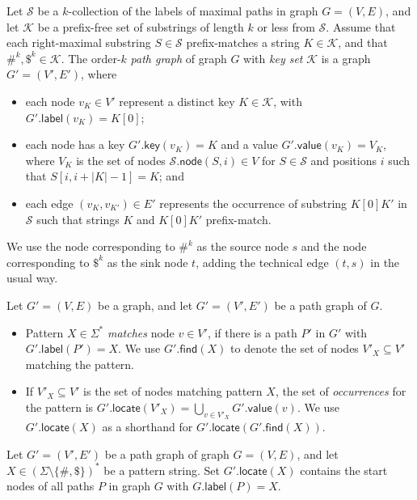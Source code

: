 \documentclass[a4paper,UKenglish]{lipics-v2016}
\newcommand{\set}[1]{\ensuremath{\{ #1 \}}}
\newcommand{\abs}[1]{\ensuremath{\lvert #1 \rvert}}
\newcommand{\find}{\ensuremath{\mathsf{find}}}
\newcommand{\locate}{\ensuremath{\mathsf{locate}}}
\newcommand{\glabel}{\ensuremath{\mathsf{label}}}
\newcommand{\gkey}{\ensuremath{\mathsf{key}}}
\newcommand{\gvalue}{\ensuremath{\mathsf{value}}}
\newcommand{\gnode}{\ensuremath{\mathsf{node}}}
\newcommand{\kcollection}[1]{$#1$\nobreakdash-collection}
\newcommand{\orderk}[1]{order\nobreakdash-$#1$}
\newcommand{\patternset}{\ensuremath{(\Sigma \setminus \set{\#, \$})^{\ast}}}
\begin{document}
\begin{definition}
Let $\mathcal{S}$ be a \kcollection{k} of the labels of maximal paths in graph $G = (V, E)$, and let $\mathcal{K}$ be a prefix-free set of substrings of length $k$ or less from $\mathcal{S}$. Assume that each right-maximal substring $S \in \mathcal{S}$ prefix-matches a string $K \in \mathcal{K}$, and that $\#^{k}, \$^{k} \in \mathcal{K}$. The \orderk{k} \emph{path graph} of graph $G$ with \emph{key set} $\mathcal{K}$ is a graph $G' = (V', E')$, where
\begin{itemize}
\item each node $v_{K} \in V'$ represent a distinct key $K \in \mathcal{K}$, with $G'.\glabel(v_{K}) = K[0]$;
\item each node has a key $G'.\gkey(v_{K}) = K$ and a value $G'.\gvalue(v_{K}) = V_{K}$, where $V_{K}$ is the set of nodes $\mathcal{S}.\gnode(S, i) \in V$ for $S \in \mathcal{S}$ and positions $i$ such that $S[i, i+\abs{K}-1] = K$; and
\item each edge $(v_{K}, v_{K'}) \in E'$ represents the occurrence of substring $K[0] K'$ in $\mathcal{S}$ such that strings $K$ and $K[0] K'$ prefix-match.
\end{itemize}
We use the node corresponding to $\#^{k}$ as the source node $s$ and the node corresponding to $\$^{k}$ as the sink node $t$, adding the technical edge $(t, s)$ in the usual way.
\end{definition}

\begin{definition}
Let $G' = (V, E)$ be a graph, and let $G' = (V', E')$ be a path graph of $G$.
\begin{itemize}
\item Pattern $X \in \Sigma^{\ast}$ \emph{matches} node $v \in V'$, if there is a path $P'$ in $G'$ with $G'.\glabel(P') = X$. We use $G'.\find(X)$ to denote the set of nodes $V'_{X} \subseteq V'$ matching the pattern.
\item If $V'_{X} \subseteq V'$ is the set of nodes matching pattern $X$, the set of \emph{occurrences} for the pattern is $G'.\locate(V'_{X}) = \bigcup_{v \in V'_{X}} G'.\gvalue(v)$. We use $G'.\locate(X)$ as a shorthand for $G'.\locate(G'.\find(X))$.
\end{itemize}
\end{definition}

\begin{lemma}\label{lemma:pg-fn}
Let $G' = (V', E')$ be a path graph of graph $G = (V, E)$, and let $X \in \patternset$ be a pattern string. Set $G'.\locate(X)$ contains the start nodes of all paths $P$ in graph $G$ with $G.\glabel(P) = X$.
\end{lemma}
\end{document}
